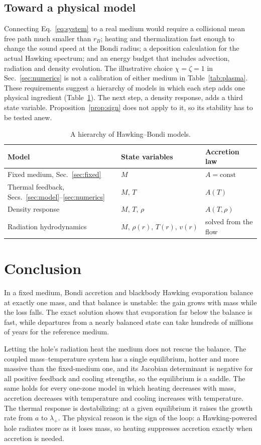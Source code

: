 \documentclass[11pt,a4paper]{article}
\begin{document}
\subsection{Toward a physical model}
Connecting Eq.~\eqref{eq:system} to a real medium would require a collisional mean free path much smaller than $r_B$; heating and thermalization fast enough to change the sound speed at the Bondi radius; a deposition calculation for the actual Hawking spectrum; and an energy budget that includes advection, radiation and density evolution. The illustrative choice $\chi=\zeta=1$ in Sec.~\ref{sec:numerics} is not a calibration of either medium in Table~\ref{tab:plasma}. These requirements suggest a hierarchy of models in which each step adds one physical ingredient (Table~\ref{tab:hierarchy}). The next step, a density response, adds a third state variable. Proposition~\ref{prop:sign} does not apply to it, so its stability has to be tested anew.

\begin{table}[tbp]
\centering\small
\caption{A hierarchy of Hawking--Bondi models.}
\label{tab:hierarchy}
\begin{tabular}{@{}lll@{}}
\toprule
Model & State variables & Accretion law\\
\midrule
Fixed medium, Sec.~\ref{sec:fixed} & $M$ & $A=\text{const}$\\
Thermal feedback, Secs.~\ref{sec:model}--\ref{sec:numerics} & $M,\,T$ & $A(T)$\\
Density response & $M,\,T,\,\rho$ & $A(T,\rho)$\\
Radiation hydrodynamics & $M,\,\rho(r),\,T(r),\,v(r)$ & solved from the flow\\
\bottomrule
\end{tabular}
\end{table}

\section{Conclusion}
In a fixed medium, Bondi accretion and blackbody Hawking evaporation balance at exactly one mass, and that balance is unstable: the gain grows with mass while the loss falls. The exact solution shows that evaporation far below the balance is fast, while departures from a nearly balanced state can take hundreds of millions of years for the reference medium.

Letting the hole's radiation heat the medium does not rescue the balance. The coupled mass--temperature system has a single equilibrium, hotter and more massive than the fixed-medium one, and its Jacobian determinant is negative for all positive feedback and cooling strengths, so the equilibrium is a saddle. The same holds for every one-zone model in which heating decreases with mass, accretion decreases with temperature and cooling increases with temperature. The thermal response is destabilizing: at a given equilibrium it raises the growth rate from $a$ to $\lambda_+$. The physical reason is the sign of the loop: a Hawking-powered hole radiates more as it loses mass, so heating suppresses accretion exactly when accretion is needed.
\end{document}
